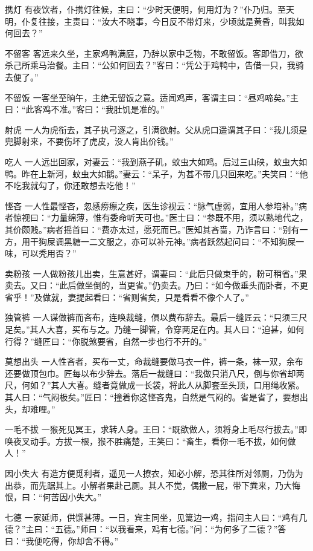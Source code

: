 \documentclass[12pt,UTF8]{ctexbook}
\begin{document}
携灯
有夜饮者，仆携灯往候，主曰：“少时天便明，何用灯为？”仆乃归。至天明，仆复往接，主责曰：“汝大不晓事，今日反不带灯来，少顷就是黄昏，叫我如何回去？”

不留客
客远来久坐，主家鸡鸭满庭，乃辞以家中乏物，不敢留饭。客即借刀，欲杀己所乘马治餐。主曰：“公如何回去？”客曰：“凭公于鸡鸭中，告借一只，我骑去便了。”

不留饭
一客坐至晌午，主绝无留饭之意。适闻鸡声，客谓主曰：“昼鸡啼矣。”主曰：“此客鸡不准。”客曰：“我肚饥是准的。”

射虎
一人为虎衔去，其子执弓逐之，引满欲射。父从虎口遥谓其子曰：“我儿须是兜脚射来，不要伤坏了虎皮，没人肯出价钱。”

吃人
一人远出回家，对妻云：“我到燕子矶，蚊虫大如鸡。后过三山硖，蚊虫大如鸭。昨在上新河，蚊虫大如鹅。”妻云：“呆子，为甚不带几只回来吃。”夫笑曰：“他不吃我就勾了，你还敢想去吃他！”

悭吝
一人性最悭吝，忽感痨瘵之疾，医生诊视云：“脉气虚弱，宜用人参培补。”病者惊视曰：“力量绵薄，惟有委命听天可也。”医士曰：“参既不用，须以熟地代之，其价颇贱。”病者摇首曰：“费亦太过，愿死而已。”医知其吝啬，乃诈言曰：“别有一方，用干狗屎调黑糖一二文服之，亦可以补元神。”病者跃然起问曰：“不知狗屎一味，可以秃用否？”

卖粉孩
一人做粉孩儿出卖，生意甚好，谓妻曰：“此后只做束手的，粉可稍省。”果卖去。又曰：“此后做坐倒的，当更省。”仍卖去。乃曰：“如今做垂头而卧者，不更省乎！”及做就，妻提起看曰：“省则省矣，只是看看不像个人了。”

独管裤
一人谋做裤而吝布，连唤裁缝，俱以费布辞去。最后一缝匠云：“只须三尺足矣。”其人大喜，买布与之。乃缝一脚管，令穿两足在内。其人曰：“迫甚，如何行得？”缝匠曰：“你脱煞要省，自然一步也行不开的。”

莫想出头
一人性吝者，买布一丈，命裁缝要做马衣一件，裤一条，袜一双，余布还要做顶包巾。匠每以布少辞去。落后一裁缝曰：“我做只消八尺，倒与你省却两尺，何如？”其人大喜。缝者竟做成一长袋，将此人从脚套至头顶，口用绳收紧。其人曰：“气闷极矣。”匠曰：“撞着你这悭吝鬼，自然是气闷的。省是省了，要想出头，却难哩。”

一毛不拔
一猴死见冥王，求转人身。王曰：“既欲做人，须将身上毛尽行拔去。”即唤夜叉动手。方拔一根，猴不胜痛楚，王笑曰：“畜生，看你一毛不拔，如何做人！”

因小失大
有造方便觅利者，遥见一人撩衣，知必小解，恐其往所对邻厕，乃伪为出恭，而先踞其上。小解者果赴己厕。其人不觉，偶撒一屁，带下粪来，乃大悔恨，曰：“何苦因小失大。”

七德
一家延师，供馔甚薄。一日，宾主同坐，见篱边一鸡，指问主人曰：“鸡有几德？”主曰：“五德。”师曰：“以我看来，鸡有七德。”问：“为何多了二德？”答曰：“我便吃得，你却舍不得。”
\end{document}
